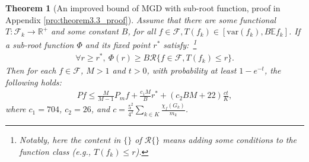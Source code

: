 \documentclass{article}
\def\sR{\mathbb{R}}
\def\vx{{\mathbf{x}}}
\def\eE{\mathbb{E}}
\newtheorem{theorem}{Theorem}
\begin{document}
\begin{theorem}[An improved bound of MGD with sub-root function, proof in Appendix \ref{pro:theorem3.3_proof}]
Assume that there are some functional $T : \mathcal{F}_k \rightarrow \sR^+$ and some constant $B$, for all $f \in \mathcal{F}, T(f_k) \in [\mathrm{var}(f_k), B\eE f_k]$. 
If a sub-root function $\Phi$ and its fixed point $r^*$
satisfy:~\footnote{Notably, here the content in $\{\}$ of $\mathcal{R}\{\}$ means adding some conditions to the function class (e.g., $T(f_k) \leq r$).}
\begin{align} \label{eq:def-sub-root}
    \forall r \geq r^*, ~
    \Phi (r) \geq B \mathcal{R} \{ f \in \mathcal{F}, T(f_k) \leq r \}.
\end{align}
Then for each $f\in \mathcal{F}$, $M >1$ and $t > 0$, with probability at least $1 - e^{-t}$, the following holds:
 \begin{align} \label{eq: thm sub-root 3.3_1}
    P f \leq \frac{M}{M-1} P _m f + \frac{c_1 M}{B} r^* + (c_2 BM +22 ) \frac{ct}{K},  
\end{align}
where $c_1 = 704$, $c_2 = 26$, and $c = \frac{5^2}{4^2} \sum_{k \in K}\frac{\chi_f(G_k)}{m_k} $. 
\end{theorem}
\end{document}

